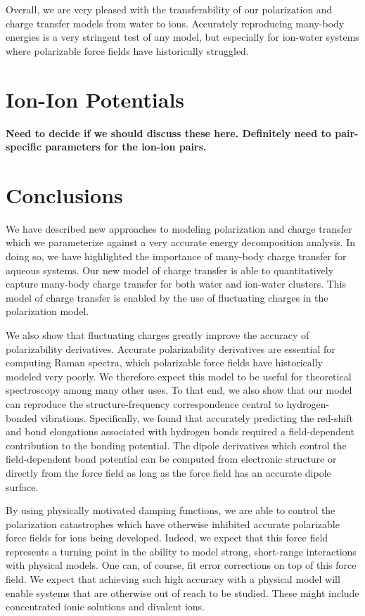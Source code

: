 \documentclass[journal=jacsat,manuscript=article]{achemso}
\begin{document}
Overall, we are very pleased with the transferability of our polarization and charge transfer models from water to ions. Accurately reproducing many-body energies is a very stringent test of any model, but especially for ion-water systems where polarizable force fields have historically struggled.

\section*{Ion-Ion Potentials}

\textbf{Need to decide if we should discuss these here. Definitely need to pair-specific parameters
for the ion-ion pairs.}

\section*{Conclusions}

We have described new approaches to modeling polarization and charge transfer which we parameterize against a very accurate energy decomposition analysis. In doing so, we have highlighted the importance of many-body charge transfer for aqueous systems. Our new model of charge transfer is able to quantitatively capture many-body charge transfer for both water and ion-water clusters. This model of charge transfer is enabled by the use of fluctuating charges in the polarization model.

We also show that fluctuating charges greatly improve the accuracy of polarizability derivatives. Accurate polarizability derivatives are essential for computing Raman spectra, which polarizable force fields have historically modeled very poorly. We therefore expect this model to be useful for theoretical spectroscopy among many other uses. To that end, we also show that our model can reproduce the structure-frequency correspondence central to hydrogen-bonded vibrations. Specifically, we found that accurately predicting the red-shift and bond elongations associated with hydrogen bonds required a field-dependent contribution to the bonding potential. The dipole derivatives which control the field-dependent bond potential can be computed from electronic structure or directly from the force field as long as the force field has an accurate dipole surface.

By using physically motivated damping functions, we are able to control the polarization catastrophes which have otherwise inhibited accurate polarizable force fields for ions being developed. Indeed, we expect that this force field represents a turning point in the ability to model strong, short-range interactions with physical models. One can, of course, fit error corrections on top of this force field. We expect that achieving such high accuracy with a physical model will enable systems that are otherwise out of reach to be studied. These might include concentrated ionic solutions and divalent ions.
\end{document}
